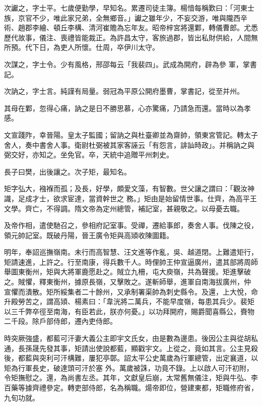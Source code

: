 \begin{pinyinscope}
 次讞之，字士平。七歲便勤學，早知名。累遷司徒主簿。楊愔每稱歎曰：「河東士族，京官不少，唯此家兄弟，全無鄉音。」讞之雖年少，不妄交游，唯與隴西辛術、趙郡李繪、頓丘李構、清河崔贍為忘年友。昭帝梓宮將還鄴，轉儀曹郎。尤悉歷代故事，儀注、喪禮皆能裁正。為許昌太守，客旅過郡，皆出私財供給，人間無所預。代下日，為吏人所懷。仕周，卒伊川太守。



 次謀之，字士令。少有風格，邢邵每云「我裴四」。武成為開府，辟為參
 軍，掌書記。



 次訥之，字士言。純謹有局量。弱冠為平原公開府墨曹，掌書記，從至并州。



 其母在鄴，忽得心痛，訥之是日不勝思慕，心亦驚痛，乃請急而還。當時以為孝感。



 文宣踐阼，幸晉陽。皇太子監國；留訥之與杜臺卿並為齋帥，領東宮管記。轉太子舍人，奏中書舍人事。衛尉杜弼被其家客誣云「有怨言，誹訕時政」。并稱訥之與弼交好，亦知之。坐免官。卒，天統中追贈平州刺史。



 長子曰樊，出後讓之。次子矩，最知名。



 矩字弘大，襁褓而孤；及長，好學，頗愛文藻，有智數。世父讓之謂曰：「觀汝神識，足成才士，欲求宦達，當資幹世之
 務。」矩由是始留情世事。仕齊，為高平王文學。齊亡，不得調。隋文帝為定州總管，補記室，甚親敬之。以母憂去職。



 及帝作相，遣使馳召之，參相府記室事。受禪，遷給事郎，奏舍人事。伐陳之役，領元帥記室。既破丹陽，晉王廣令矩與高熲收陳圖籍。



 明年，奉詔巡撫嶺南。未行而高智慧、汪文進等作亂，吳、越道閉。上難遣矩行，矩請速進，上許之。行至南康，得兵數千人。時俚帥王仲宣逼廣州，遣其部將周師舉圖東衡州，矩與大將軍鹿愿赴之。賊立九柵，屯大庾嶺，共為聲援。矩進擊破之。賊懼，釋東衡州，據原長嶺，又擊敗之。遂斬師舉，進軍自南海拔廣州，仲
 宣懼而潰散。矩所綏集者二十餘州，又承制署渠帥為刺史縣令。及還，上大悅，命升殿勞苦之，謂高熲、楊素曰：「韋洸將二萬兵，不能早度嶺，每患其兵少。裴矩以三千弊卒徑至南海，有臣若此，朕亦何憂。」以功拜開府，賜爵聞喜縣公，賚物二千段。除戶部侍郎，遷內吏侍郎。



 時突厥強盛，都藍可汗妻大義公主即宇文氏女，由是數為邊患。後因公主與從胡私通，長孫晟先發其事，矩請出使說都藍，顯戳宇文。上從之，竟如其言。公主見殺後，都藍與突利可汗構難，屢犯亭鄣。詔太平公史萬歲為行軍總管，出定襄道，以矩為行軍長史，破達頭可汗於塞
 外。萬歲被誅，功竟不錄。上以啟人可汗初附，令矩撫慰之。還，為尚書左丞。其年，文獻皇后崩，太常舊無儀注，矩與牛弘、李百藥等據齊禮參定。轉吏部侍郎，名為稱職。煬帝即位，營建東都，矩職修府省，九旬功就。




\end{pinyinscope}
